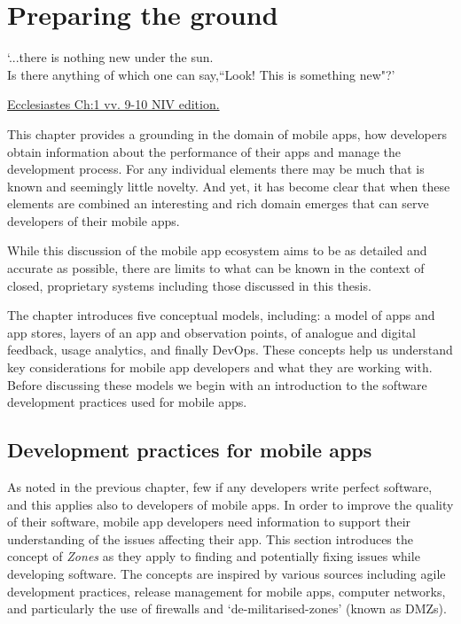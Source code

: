 \setchapterpreamble[u]{\margintoc}
\chapter{Preparing the ground}
\label{chapter-preparing-the-ground}

\epigraph{`...there is nothing new under the sun. \\Is there anything of which one can say,``Look! This is something new"?'}{\href{https://www.biblegateway.com/passage/?search=Ecclesiastes+1\%3A9-10&version=NIV}{Ecclesiastes Ch:1 vv. 9-10 NIV edition.}}

\vspace{10mm}

This chapter provides a grounding in the domain of mobile apps, how developers obtain information about the performance of their apps and manage the development process.  For any individual elements there may be much that is known and seemingly little novelty. And yet, it has become clear that when these elements are combined an interesting and rich domain emerges that can serve developers of their mobile apps.

While this discussion of the mobile app ecosystem aims to be as detailed and accurate as possible, there are limits to what can be known in the context of closed, proprietary systems including those discussed in this thesis. 

The chapter introduces five conceptual models, including: a model of apps and app stores, layers of an app and observation points, of analogue and digital feedback, usage analytics, and finally DevOps. These concepts help us understand key considerations for mobile app developers and what they are working with. Before discussing these models we begin with an introduction to the software development practices used for mobile apps.



\section{Development practices for mobile apps}
As noted in the previous chapter, few if any developers write perfect software, and this applies also to developers of mobile apps. In order to improve the quality of their software, mobile app developers need information to support their understanding of the issues affecting their app. This section introduces the concept of \emph{Zones} as they apply to finding and potentially fixing issues while developing software. The concepts are inspired by various sources including agile development practices, release management for mobile apps, computer networks, and particularly the use of firewalls and `de-militarised-zones' (known as DMZs). 

